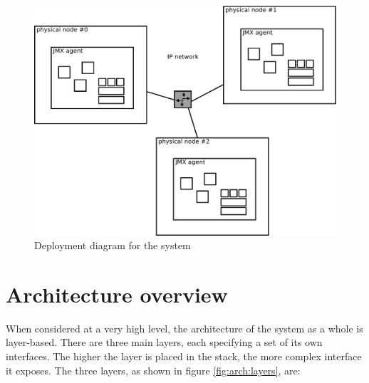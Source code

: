 \documentclass[11pt,openany]{book}
\begin{document}
      \begin{figure}[H]
        \begin{center}
          \includegraphics[width=.8\textwidth]{img/architecture/deployment.pdf}
        \end{center}

        \caption{Deployment diagram for the system}
        \label{fig:arch:deployment}
      \end{figure}


    \section{Architecture overview}
    \label{sec:arch:over}

      When considered at a very high level, the architecture of the system as a whole is layer-based. There are three
      main layers, each specifying a set of its own interfaces. The higher the layer is placed in the stack, the more
      complex interface it exposes. The three layers, as shown in figure \ref{fig:arch:layers}, are:
\end{document}

